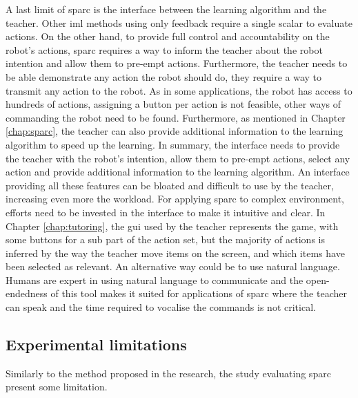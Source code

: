 A last limit of \gls{sparc} is the interface between the learning algorithm and the teacher. Other \gls{iml} methods using only feedback require a single scalar to evaluate actions. On the other hand, to provide full control and accountability on the robot's actions, \gls{sparc} requires a way to inform the teacher about the robot intention and allow them to pre-empt actions. Furthermore, the teacher needs to be able demonstrate any action the robot should do, they require a way to transmit any action to the robot. As in some applications, the robot has access to hundreds of actions, assigning a button per action is not feasible, other ways of commanding the robot need to be found. Furthermore, as mentioned in Chapter \ref{chap:sparc}, the teacher can also provide additional information to the learning algorithm to speed up the learning. In summary, the interface needs to provide the teacher with the robot's intention, allow them to pre-empt actions, select any action and provide additional information to the learning algorithm. An interface providing all these features can be bloated and difficult to use by the teacher, increasing even more the workload. For applying \gls{sparc} to complex environment, efforts need to be invested in the interface to make it intuitive and clear. In Chapter \ref{chap:tutoring}, the \gls{gui} used by the teacher represents the game, with some buttons for a sub part of the action set, but the majority of actions is inferred by the way the teacher move items on the screen, and which items have been selected as relevant. An alternative way could be to use natural language. Humans are expert in using natural language to communicate and the open-endedness of this tool makes it suited for applications of \gls{sparc} where the teacher can speak and the time required to vocalise the commands is not critical.

\subsection{Experimental limitations} \label{sec:disc_experiments} 

Similarly to the method proposed in the research, the study evaluating \gls{sparc} present some limitation. 

